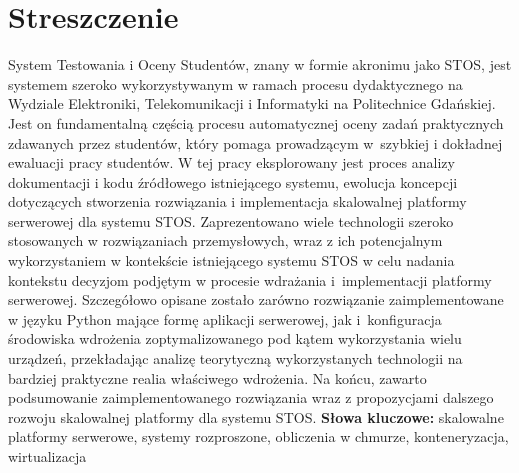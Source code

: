 \chapter*{Streszczenie}
\indent System Testowania i Oceny Studentów, znany w formie akronimu jako STOS, jest systemem szeroko wykorzystywanym w ramach procesu dydaktycznego na Wydziale Elektroniki, Telekomunikacji i Informatyki na Politechnice Gdańskiej. Jest on fundamentalną częścią procesu automatycznej oceny zadań praktycznych zdawanych przez studentów, który pomaga prowadzącym w~szybkiej i dokładnej ewaluacji pracy studentów. 
\newline \noindent W tej pracy eksplorowany jest proces analizy dokumentacji i kodu źródłowego istniejącego systemu, ewolucja koncepcji dotyczących stworzenia rozwiązania i implementacja skalowalnej platformy serwerowej dla systemu STOS. Zaprezentowano wiele technologii szeroko stosowanych w rozwiązaniach przemysłowych, wraz z ich potencjalnym wykorzystaniem w kontekście istniejącego systemu STOS w celu nadania kontekstu decyzjom podjętym w procesie wdrażania i~implementacji platformy serwerowej. Szczegółowo opisane zostało zarówno rozwiązanie zaimplementowane w języku Python mające formę aplikacji serwerowej, jak i~konfiguracja środowiska wdrożenia zoptymalizowanego pod kątem wykorzystania wielu urządzeń, przekładając analizę teorytyczną wykorzystanych technologii na bardziej praktyczne realia właściwego wdrożenia. Na końcu, zawarto podsumowanie zaimplementowanego rozwiązania wraz z propozycjami dalszego rozwoju skalowalnej platformy dla systemu STOS.
\vspace{0.5cm}\newline
\textbf{Słowa kluczowe:} skalowalne platformy serwerowe, systemy rozproszone, obliczenia w chmurze, konteneryzacja, wirtualizacja\vspace{0.5cm}
